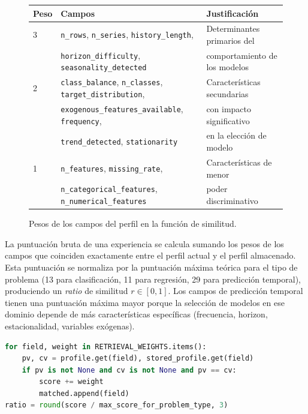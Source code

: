 \begin{figure}[H]
\centering
\begin{tabular}{lll}
\hline
\textbf{Peso} & \textbf{Campos} & \textbf{Justificación} \\
\hline
3 & \texttt{n\_rows}, \texttt{n\_series}, \texttt{history\_length}, & Determinantes primarios del \\
  & \texttt{horizon\_difficulty}, \texttt{seasonality\_detected} & comportamiento de los modelos \\
\hline
2 & \texttt{class\_balance}, \texttt{n\_classes}, \texttt{target\_distribution}, & Características secundarias \\
  & \texttt{exogenous\_features\_available}, \texttt{frequency}, & con impacto significativo \\
  & \texttt{trend\_detected}, \texttt{stationarity} & en la elección de modelo \\
\hline
1 & \texttt{n\_features}, \texttt{missing\_rate}, & Características de menor \\
  & \texttt{n\_categorical\_features}, \texttt{n\_numerical\_features} & poder discriminativo \\
\hline
\end{tabular}
\caption{Pesos de los campos del perfil en la función de similitud.}
\label{tab:similarity-weights}
\end{figure}

La puntuación bruta de una experiencia se calcula sumando los pesos de los campos que coinciden exactamente entre el perfil actual y el perfil almacenado. Esta puntuación se normaliza por la puntuación máxima teórica para el tipo de problema (13 para clasificación, 11 para regresión, 29 para predicción temporal), produciendo un \emph{ratio} de similitud $r \in [0, 1]$. Los campos de predicción temporal tienen una puntuación máxima mayor porque la selección de modelos en ese dominio depende de más características específicas (frecuencia, horizon, estacionalidad, variables exógenas).

\begin{lstlisting}[language=Python, caption={Fragmento del cálculo de similitud ponderada.}, label={lst:similarity}]
for field, weight in RETRIEVAL_WEIGHTS.items():
    pv, cv = profile.get(field), stored_profile.get(field)
    if pv is not None and cv is not None and pv == cv:
        score += weight
        matched.append(field)
ratio = round(score / max_score_for_problem_type, 3)
\end{lstlisting}

